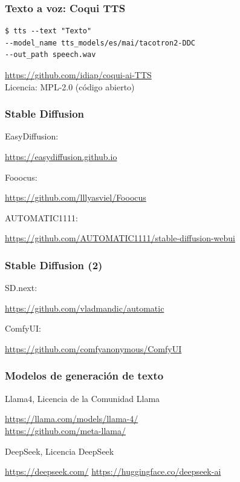 \documentclass[17pt,aspectratio=169,hyperref={pdfusetitle,colorlinks,allcolors=olive}]{beamer}
\begin{document}
\begin{frame}[fragile]
\frametitle{Texto a voz: Coqui TTS}

{\small
\begin{verbatim}
$ tts --text "Texto"
--model_name tts_models/es/mai/tacotron2-DDC
--out_path speech.wav
\end{verbatim}
}

\begin{flushright}
{\small
\url{https://github.com/idiap/coqui-ai-TTS} \\
Licencia: MPL-2.0 (código abierto) \\
}
\end{flushright}

\end{frame}

\begin{frame}[fragile]
\frametitle{Stable Diffusion}

EasyDiffusion:
\begin{flushright}
\url{https://easydiffusion.github.io}
\end{flushright}

Fooocus:
\begin{flushright}
\url{https://github.com/lllyasviel/Fooocus}
\end{flushright}

AUTOMATIC1111:
\begin{flushright}
\url{https://github.com/AUTOMATIC1111/stable-diffusion-webui}
\end{flushright}

\end{frame}

\begin{frame}[fragile]
\frametitle{Stable Diffusion (2)}

SD.next:
\begin{flushright}
\url{https://github.com/vladmandic/automatic}
\end{flushright}

ComfyUI:
\begin{flushright}
\url{https://github.com/comfyanonymous/ComfyUI}
\end{flushright}

\end{frame}

\begin{frame}[fragile]
\frametitle{Modelos de generación de texto}

Llama4, Licencia de la Comunidad Llama
\begin{flushright}
\url{https://llama.com/models/llama-4/} \\
\url{https://github.com/meta-llama/}
\end{flushright}

DeepSeek, Licencia DeepSeek

\begin{flushright}
\url{https://deepseek.com/}
\url{https://huggingface.co/deepseek-ai}
\end{flushright}

\end{frame}
\end{document}
